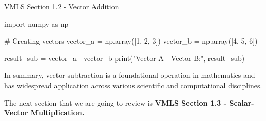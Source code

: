 \begin{notes}{VMLS Section 1.2 - Vector Addition}
\begin{highlight}
    \begin{code}[Python]
    import numpy as np

    # Creating vectors
    vector_a = np.array([1, 2, 3])
    vector_b = np.array([4, 5, 6])
    
    result_sub = vector_a - vector_b
    print("Vector A - Vector B:", result_sub)        
    \end{code}
    \end{highlight}

    In summary, vector subtraction is a foundational operation in mathematics and has widespread application across various scientific and computational disciplines.
\end{notes}

The next section that we are going to review is \textbf{VMLS Section 1.3 - Scalar-Vector Multiplication.}

